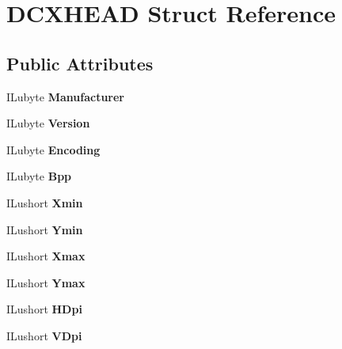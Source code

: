 \hypertarget{structDCXHEAD}{}\section{D\+C\+X\+H\+E\+AD Struct Reference}
\label{structDCXHEAD}
\subsection*{Public Attributes}
\begin{DoxyCompactItemize}
\item 
\mbox{\label{structDCXHEAD_a2f6c8672b17e00fb97d4cef56c5119c7}} 
I\+Lubyte {\bfseries Manufacturer}
\item 
\mbox{\label{structDCXHEAD_aadf0cd991116b1fcb3aba45913d1d484}} 
I\+Lubyte {\bfseries Version}
\item 
\mbox{\label{structDCXHEAD_a467210ed750f10ee4a800fa2b6b144ea}} 
I\+Lubyte {\bfseries Encoding}
\item 
\mbox{\label{structDCXHEAD_a43ee466650d9a214042db5471445eced}} 
I\+Lubyte {\bfseries Bpp}
\item 
\mbox{\label{structDCXHEAD_a1c69b47f737e16362a9c52969c5a51ed}} 
I\+Lushort {\bfseries Xmin}
\item 
\mbox{\label{structDCXHEAD_a1afa144ca86ed7ab2c3e7afe53d968c1}} 
I\+Lushort {\bfseries Ymin}
\item 
\mbox{\label{structDCXHEAD_ad8ffd59eeb25f10abaa4b1ae2c508a71}} 
I\+Lushort {\bfseries Xmax}
\item 
\mbox{\label{structDCXHEAD_a456b56d6e8c67f14a7120ab2835a0b86}} 
I\+Lushort {\bfseries Ymax}
\item 
\mbox{\label{structDCXHEAD_a804f68a66d088fa49fda833eac8e210a}} 
I\+Lushort {\bfseries H\+Dpi}
\item 
\mbox{\label{structDCXHEAD_ad251f340b916756bf64bbdff9e7ca370}} 
I\+Lushort {\bfseries V\+Dpi}
\item 

\end{DoxyCompactItemize}
